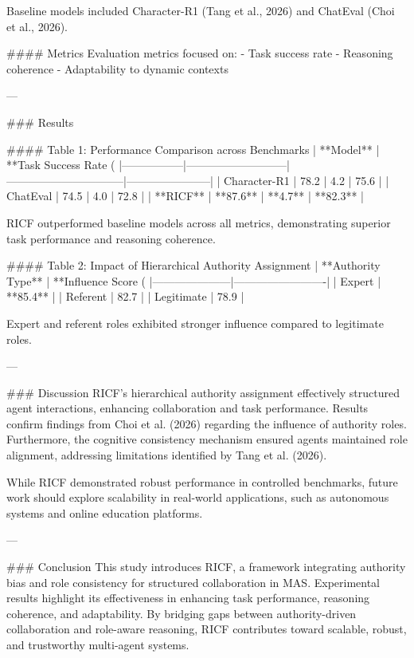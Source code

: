 Baseline models included Character-R1 (Tang et al., 2026) and ChatEval (Choi et al., 2026).

#### Metrics
Evaluation metrics focused on:
- Task success rate
- Reasoning coherence
- Adaptability to dynamic contexts

---

### Results

#### Table 1: Performance Comparison across Benchmarks
| **Model**      | **Task Success Rate (%
|-----------------|---------------------------|--------------------------------|-----------------------|
| Character-R1    | 78.2                     | 4.2                          | 75.6                 |
| ChatEval        | 74.5                     | 4.0                          | 72.8                 |
| **RICF**        | **87.6**                 | **4.7**                      | **82.3**             |

RICF outperformed baseline models across all metrics, demonstrating superior task performance and reasoning coherence.

#### Table 2: Impact of Hierarchical Authority Assignment
| **Authority Type** | **Influence Score (%
|---------------------|-------------------------|
| Expert             | **85.4**               |
| Referent           | 82.7                   |
| Legitimate         | 78.9                   |

Expert and referent roles exhibited stronger influence compared to legitimate roles.

---

### Discussion
RICF's hierarchical authority assignment effectively structured agent interactions, enhancing collaboration and task performance. Results confirm findings from Choi et al. (2026) regarding the influence of authority roles. Furthermore, the cognitive consistency mechanism ensured agents maintained role alignment, addressing limitations identified by Tang et al. (2026).

While RICF demonstrated robust performance in controlled benchmarks, future work should explore scalability in real-world applications, such as autonomous systems and online education platforms.

---

### Conclusion
This study introduces RICF, a framework integrating authority bias and role consistency for structured collaboration in MAS. Experimental results highlight its effectiveness in enhancing task performance, reasoning coherence, and adaptability. By bridging gaps between authority-driven collaboration and role-aware reasoning, RICF contributes toward scalable, robust, and trustworthy multi-agent systems.

